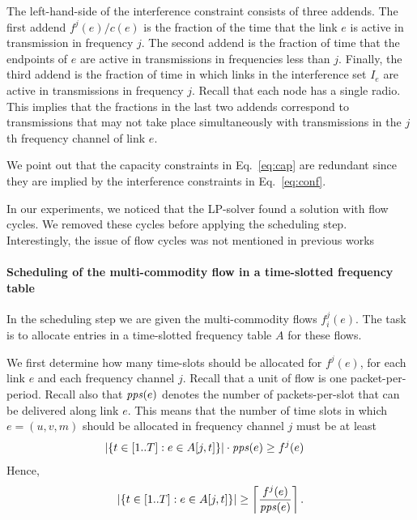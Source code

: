 \documentclass[12pt]{article}
\newenvironment{proof sketch}[1]{\noindent {\emph{Proof sketch of #1:}}}{\hfill \qed}
\newcommand{\pps}{\text{\emph{pps}}}
\begin{document}
The left-hand-side of the interference constraint consists of three
addends. The first addend $f^j(e)/c(e)$ is the fraction of the time
that the link $e$ is active in transmission in frequency $j$. The
second addend is the fraction of time that the endpoints of $e$ are
active in transmissions in frequencies less than $j$.  Finally, the
third addend is the fraction of time in which links in the
interference set $I_e$ are active in transmissions in frequency $j$.
Recall that each node has a single radio.  This implies that the
fractions in the last two addends correspond to transmissions that may
not take place simultaneously with transmissions in the $j$th
frequency channel of link $e$.

We point out that the capacity constraints in Eq.~\ref{eq:cap} are
redundant since they are implied by the interference constraints in
Eq.~\ref{eq:conf}.

In our experiments, we noticed that the LP-solver found a solution
with flow cycles. We removed these cycles before applying the
scheduling step.  Interestingly, the issue of flow cycles was not
mentioned in previous
works~\cite{alicherry2005joint11,buragohain2007improved}


\paragraph{Scheduling of the multi-commodity flow in a time-slotted
  frequency table}
In the scheduling step we are given the multi-commodity flows
$f^j_i(e)$.  The task is to allocate entries in a
time-slotted frequency table $A$ for these flows.

We first determine how many time-slots should be allocated for
$f^j(e)$, for each link $e$ and each frequency channel $j$.  Recall
that a unit of flow is one packet-per-period.  Recall also that $\pps(e)$
denotes the number of packets-per-slot that can be delivered along
link $e$.   This means that the number of time slots in which
$e=(u,v,m)$ should be allocated in frequency channel $j$ must be at
least
\begin{align*}
  |\{ t\in[1..T] :e\in A[j,t]\}| \cdot \pps(e) &\geq f^j(e)
\end{align*}
Hence,
\begin{align}\label{eq:req}
  |\{ t\in[1..T] :e\in A[j,t]\}| \geq \left\lceil \frac{f^j(e)}{\pps(e)} \right\rceil.
  \end{align}
\end{document}
